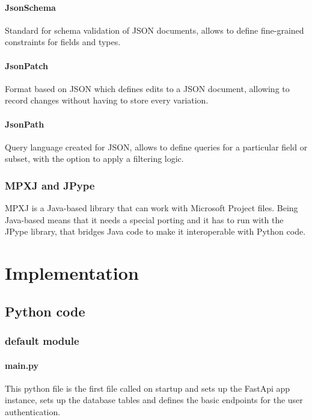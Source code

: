 \documentclass[12pt]{report}
\begin{document}
\subsubsection{JsonSchema}
Standard for schema validation of JSON documents, allows to define fine-grained constraints for fields and types.

\subsubsection{JsonPatch}
Format based on JSON which defines edits to a JSON document, allowing to record changes without having to store every variation.

\subsubsection{JsonPath}
Query language created for JSON, allows to define queries for a particular field or subset, with the option to apply a filtering logic.

\subsection{MPXJ and JPype}
MPXJ is a Java-based library that can work with Microsoft Project files. Being Java-based means that it needs a special porting and it has to run with the JPype library, that bridges Java code to make it interoperable with Python code.

\chapter{Implementation}

\section{Python code}

\subsection{default module}

\subsubsection{main.py}
This python file is the first file called on startup and sets up the FastApi app instance, sets up the database tables and defines the basic endpoints for the user authentication.
\end{document}
